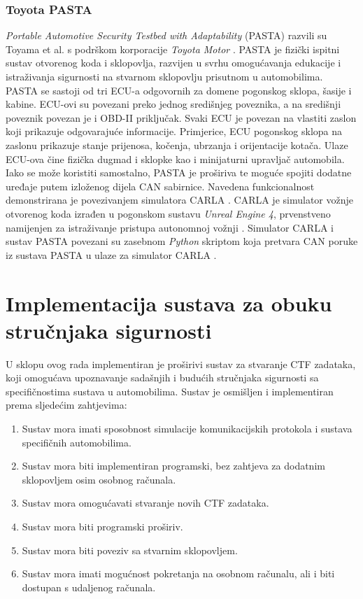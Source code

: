 \documentclass[times, utf8, diplomski, numeric]{fer}
\begin{document}
\subsection{Toyota PASTA}
\textit{Portable Automotive Security Testbed with Adaptability} (PASTA) razvili su Toyama et al. s podrškom korporacije \textit{Toyota Motor} \cite{toyama2018pasta, tsu2018pastagithub}. PASTA je fizički ispitni sustav otvorenog koda i sklopovlja, razvijen u svrhu omogućavanja edukacije i istraživanja sigurnosti na stvarnom sklopovlju prisutnom u automobilima. PASTA se sastoji od tri ECU-a odgovornih za domene pogonskog sklopa, šasije i kabine. ECU-ovi su povezani preko jednog središnjeg poveznika, a na središnji poveznik povezan je i OBD-II priključak. Svaki ECU je povezan na vlastiti zaslon koji prikazuje odgovarajuće informacije. Primjerice, ECU pogonskog sklopa na zaslonu prikazuje stanje prijenosa, kočenja, ubrzanja i orijentacije kotača. Ulaze ECU-ova čine fizička dugmad i sklopke kao i minijaturni upravljač automobila. Iako se može koristiti samostalno, PASTA je proširiva te moguće spojiti dodatne uređaje putem izloženog dijela CAN sabirnice. Navedena funkcionalnost demonstrirana je povezivanjem simulatora CARLA \cite{toyama2018pasta}. CARLA je simulator vožnje otvorenog koda izrađen u pogonskom sustavu \textit{Unreal Engine 4}, prvenstveno namijenjen za istraživanje pristupa autonomnoj vožnji \cite{dosovitskiy2017carla}. Simulator CARLA i sustav PASTA povezani su zasebnom \textit{Python} skriptom koja pretvara CAN poruke iz sustava PASTA u ulaze za simulator CARLA \cite{tsu2018pastacarla}.

\chapter{Implementacija sustava za obuku stručnjaka sigurnosti}
U sklopu ovog rada implementiran je proširivi sustav za stvaranje CTF zadataka, koji omogućava upoznavanje sadašnjih i budućih stručnjaka sigurnosti sa specifičnostima sustava u automobilima. Sustav je osmišljen i implementiran prema sljedećim zahtjevima:
\begin{enumerate}
    \item Sustav mora imati sposobnost simulacije komunikacijskih protokola i sustava specifičnih automobilima.
    \item Sustav mora biti implementiran programski, bez zahtjeva za dodatnim sklopovljem osim osobnog računala.
    \item Sustav mora omogućavati stvaranje novih CTF zadataka.
    \item Sustav mora biti programski proširiv.
    \item Sustav mora biti poveziv sa stvarnim sklopovljem.
    \item Sustav mora imati mogućnost pokretanja na osobnom računalu, ali i biti dostupan s udaljenog računala.
\end{enumerate}
\end{document}
